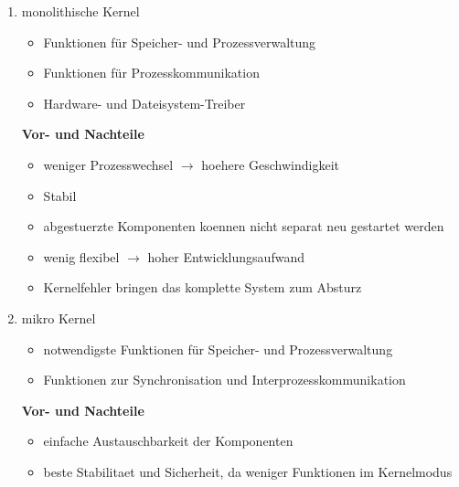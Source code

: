 \begin{enumerate}
  \item monolithische Kernel
    \begin{itemize}
      \item Funktionen für Speicher- und Prozessverwaltung
      \item Funktionen für Prozesskommunikation
      \item Hardware- und Dateisystem-Treiber
    \end{itemize}
    \textbf{Vor- und Nachteile}\\
    \begin{minipage}[t]{0.45\textwidth}
      \begin{itemize}[label=\ensuremath{+}]
      \item weniger Prozesswechsel $ \rightarrow $ hoehere Geschwindigkeit
      \item Stabil
      \end{itemize}
      \end{minipage}
      \hfill
      \begin{minipage}[t]{0.45\textwidth}
      \begin{itemize}[label=\ensuremath{-}]
      \item abgestuerzte Komponenten koennen nicht separat neu gestartet werden
      \item wenig flexibel $ \rightarrow $ hoher Entwicklungsaufwand
      \item Kernelfehler bringen das komplette System zum Absturz
      \end{itemize}
    \end{minipage}
  \item mikro Kernel
    \begin{itemize}
        \item notwendigste Funktionen für Speicher- und Prozessverwaltung
        \item Funktionen zur Synchronisation und Interprozesskommunikation
      \end{itemize}
      \textbf{Vor- und Nachteile}\\
      \begin{minipage}[t]{0.45\textwidth}
        \begin{itemize}[label=\ensuremath{+}]
        \item einfache Austauschbarkeit der Komponenten
        \item beste Stabilitaet und Sicherheit, da weniger Funktionen im Kernelmodus
        \end{itemize}

\end{minipage}
\end{enumerate}
